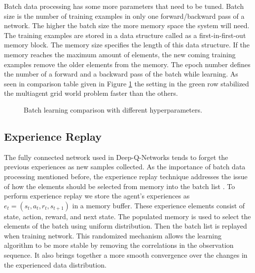 \documentclass{ituphdreport}
\begin{document}
Batch data processing has some more parameters that need to be tuned. Batch size is the number of training examples in only one forward/backward pass of a network. The higher the batch size the more memory space the system will need. The training examples are stored in a data structure called as a first-in-first-out memory block. The memory size specifies the length of this data structure. If the memory reaches the maximum amount of elements, the new coming training examples remove the older elements from the memory. The epoch number defines the number of a forward and a backward pass of the batch while learning. As seen in comparison table given in Figure \ref{fig:batchcomparison} the setting in the green row stabilized the multiagent grid world problem faster than the others. 

\begin{figure}[h]
	\begin{center}
	\end{center}
	\caption{Batch learning comparison with different hyperparameters.
		\label{fig:batchcomparison}}
\end{figure}

\subsection{Experience Replay}
The fully connected network used in Deep-Q-Networks tends to forget the previous experiences as new samples collected. As the importance of batch data processing mentioned before, the experience replay technique addresses the issue of how the elements should be selected from memory into the batch list \cite{mnih-dqn-2015}.  To perform experience replay we store the agent's experiences as $e_t = (s_t,a_t,r_t,s_{t+1})$ in a memory buffer. These experience elements consist of state, action, reward, and next state. The populated memory is used to select the elements of the batch using uniform distribution. Then the batch list is replayed when training network. This randomized mechanism allows the learning algorithm to be more stable by removing the correlations in the observation sequence. It also brings together a more smooth convergence over the changes in the experienced data distribution.
\end{document}
